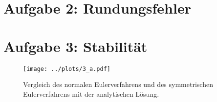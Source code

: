 \section*{Aufgabe 2: Rundungsfehler}



\section*{Aufgabe 3: Stabilität}

\begin{figure}[H]
  \centering
  \texttt{[image: ../plots/3\_a.pdf]}
  \caption{Vergleich des normalen Eulerverfahrens und des symmetrischen Eulerverfahrens mit der analytischen Lösung.}
  \label{fig:Eulervergleich}
\end{figure}




\printbibliography{}


